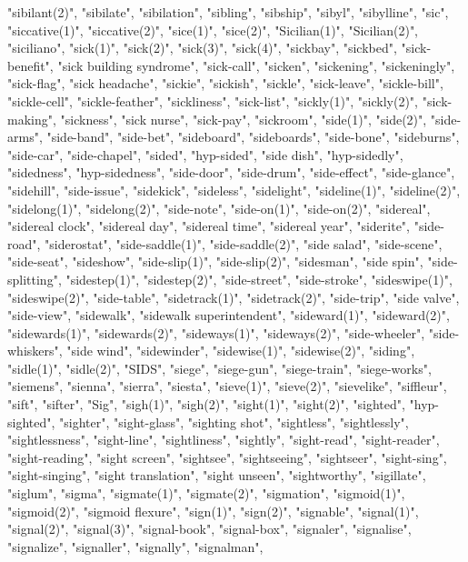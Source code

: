 "sibilant(2)",
"sibilate",
"sibilation",
"sibling",
"sibship",
"sibyl",
"sibylline",
"sic",
"siccative(1)",
"siccative(2)",
"sice(1)",
"sice(2)",
"Sicilian(1)",
"Sicilian(2)",
"siciliano",
"sick(1)",
"sick(2)",
"sick(3)",
"sick(4)",
"sickbay",
"sickbed",
"sick-benefit",
"sick building syndrome",
"sick-call",
"sicken",
"sickening",
"sickeningly",
"sick-flag",
"sick headache",
"sickie",
"sickish",
"sickle",
"sick-leave",
"sickle-bill",
"sickle-cell",
"sickle-feather",
"sickliness",
"sick-list",
"sickly(1)",
"sickly(2)",
"sick-making",
"sickness",
"sick nurse",
"sick-pay",
"sickroom",
"side(1)",
"side(2)",
"side-arms",
"side-band",
"side-bet",
"sideboard",
"sideboards",
"side-bone",
"sideburns",
"side-car",
"side-chapel",
"sided",
"hyp-sided",
"side dish",
"hyp-sidedly",
"sidedness",
"hyp-sidedness",
"side-door",
"side-drum",
"side-effect",
"side-glance",
"sidehill",
"side-issue",
"sidekick",
"sideless",
"sidelight",
"sideline(1)",
"sideline(2)",
"sidelong(1)",
"sidelong(2)",
"side-note",
"side-on(1)",
"side-on(2)",
"sidereal",
"sidereal clock",
"sidereal day",
"sidereal time",
"sidereal year",
"siderite",
"side-road",
"siderostat",
"side-saddle(1)",
"side-saddle(2)",
"side salad",
"side-scene",
"side-seat",
"sideshow",
"side-slip(1)",
"side-slip(2)",
"sidesman",
"side spin",
"side-splitting",
"sidestep(1)",
"sidestep(2)",
"side-street",
"side-stroke",
"sideswipe(1)",
"sideswipe(2)",
"side-table",
"sidetrack(1)",
"sidetrack(2)",
"side-trip",
"side valve",
"side-view",
"sidewalk",
"sidewalk superintendent",
"sideward(1)",
"sideward(2)",
"sidewards(1)",
"sidewards(2)",
"sideways(1)",
"sideways(2)",
"side-wheeler",
"side-whiskers",
"side wind",
"sidewinder",
"sidewise(1)",
"sidewise(2)",
"siding",
"sidle(1)",
"sidle(2)",
"SIDS",
"siege",
"siege-gun",
"siege-train",
"siege-works",
"siemens",
"sienna",
"sierra",
"siesta",
"sieve(1)",
"sieve(2)",
"sievelike",
"siffleur",
"sift",
"sifter",
"Sig",
"sigh(1)",
"sigh(2)",
"sight(1)",
"sight(2)",
"sighted",
"hyp-sighted",
"sighter",
"sight-glass",
"sighting shot",
"sightless",
"sightlessly",
"sightlessness",
"sight-line",
"sightliness",
"sightly",
"sight-read",
"sight-reader",
"sight-reading",
"sight screen",
"sightsee",
"sightseeing",
"sightseer",
"sight-sing",
"sight-singing",
"sight translation",
"sight unseen",
"sightworthy",
"sigillate",
"siglum",
"sigma",
"sigmate(1)",
"sigmate(2)",
"sigmation",
"sigmoid(1)",
"sigmoid(2)",
"sigmoid flexure",
"sign(1)",
"sign(2)",
"signable",
"signal(1)",
"signal(2)",
"signal(3)",
"signal-book",
"signal-box",
"signaler",
"signalise",
"signalize",
"signaller",
"signally",
"signalman",
